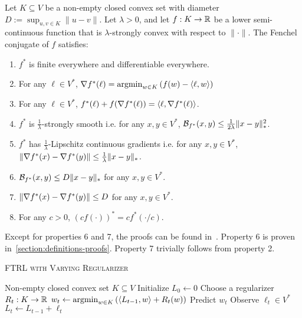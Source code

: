 \begin{proposition}
\label{proposition:conjugate-properties}
Let $K \subseteq V$ be a non-empty closed convex set with diameter
$D:=\sup_{u,v \in K} \|u-v\|$.  Let $\lambda > 0$, and let $f:K \to \mathbb{R}$ be a
lower semi-continuous function that is $\lambda$-strongly convex with respect
to $\|\cdot\|$.  The Fenchel conjugate of $f$ satisfies:
\begin{enumerate}

\item $f^*$ is finite everywhere and differentiable everywhere.

\item For any $\ell \in V^*$, $\nabla f^*(\ell) = \operatorname*{argmin}_{w \in K} \left( f(w) - \langle \ell, w \rangle \right)$

\item For any $\ell \in V^*$, $f^*(\ell) + f(\nabla f^*(\ell)) = \langle \ell, \nabla f^*(\ell) \rangle$.

\item $f^*$ is $\frac{1}{\lambda}$-strongly smooth i.e. for any $x,y \in V^*$, $\mathcal{B}_{f^*}(x, y) \le \frac{1}{2\lambda} \|x - y\|_*^2$.

\item $f^*$ has $\frac{1}{\lambda}$-Lipschitz continuous gradients i.e.
for any $x,y \in V^*$,
$\|\nabla f^*(x) - \nabla f^*(y)\| \le \frac{1}{\lambda} \|x - y\|_*$.

\item $\mathcal{B}_{f^*}(x,y) \le D\|x-y\|_*$ for any $x,y \in V^*$.

\item $\|\nabla f^*(x) - \nabla f^*(y)\| \le D$ for any $x,y \in V^*$.

\item For any $c > 0$, $(cf(\cdot))^* = cf^*(\cdot/c)$.
\end{enumerate}
\end{proposition}

Except for properties 6 and 7, the proofs can be found
in~\cite{Shalev-Shwartz-2007}.  Property 6 is proven
in~\ref{section:definitions-proofs}. Property 7 trivially follows from property
2.

\begin{algorithm}[t]
\caption{\textsc{FTRL with Varying Regularizer}}
\label{algorithm:ftrl-varying-regularizer}
\begin{algorithmic}[1]
\REQUIRE Non-empty closed convex set $K \subseteq V$
\STATE Initialize $L_0 \leftarrow 0$
\STATE Choose a regularizer $R_t:K \to \mathbb{R}$
\STATE $w_t \leftarrow \operatorname*{argmin}_{w \in K} \left( \langle L_{t-1}, w \rangle + R_t(w) \right)$
\STATE Predict $w_t$
\STATE Observe $\ell_t \in V^*$
\STATE $L_t \leftarrow L_{t-1} + \ell_t$
\ENDFOR
\end{algorithmic}
\end{algorithm}

